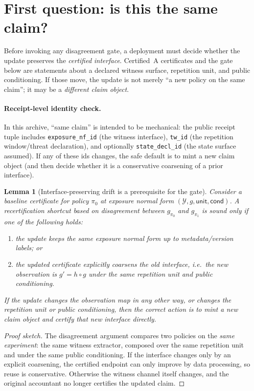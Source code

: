 \documentclass[11pt]{article}
\newtheorem{lemma}{Lemma}
\begin{document}
\section{First question: is this the same claim?}
Before invoking any disagreement gate, a deployment must decide whether the update preserves the \emph{certified interface}.
Certified~A certificates and the gate below are statements about a declared witness surface, repetition unit, and public conditioning.
If those move, the update is not merely ``a new policy on the same claim''; it may be a \emph{different claim object}.\cite{series:traceifaces,series:contractobjects}

\paragraph{Receipt-level identity check.}
In this archive, ``same claim'' is intended to be mechanical: the public receipt tuple includes \texttt{exposure\_nf\_id} (the witness interface), \texttt{tw\_id} (the repetition window/threat declaration), and optionally \texttt{state\_decl\_id} (the state surface assumed).
If any of these ids changes, the safe default is to mint a new claim object (and then decide whether it is a conservative coarsening of a prior interface).\cite{series:receiptitems,series:planstateequiv}

\begin{lemma}[Interface-preserving drift is a prerequisite for the gate]
\label{lem:sameclaimfirst}
Consider a baseline certificate for policy $\pi_0$ at exposure normal form $(\mathcal Y,g,\mathsf{unit},\mathsf{cond})$.
A recertification shortcut based on disagreement between $g_{\pi_0}$ and $g_{\pi_1}$ is sound only if one of the following holds:
\begin{enumerate}[leftmargin=*]
\item the update keeps the same exposure normal form up to metadata/version labels; or
\item the updated certificate explicitly coarsens the old interface, i.e.\ the new observation is $g' = h\circ g$ under the same repetition unit and public conditioning.
\end{enumerate}
If the update changes the observation map in any other way, or changes the repetition unit or public conditioning, then the correct action is to mint a new claim object and certify that new interface directly.
\end{lemma}

\begin{proof}[Proof sketch]
The disagreement argument compares two policies on the \emph{same experiment}: the same witness extractor, composed over the same repetition unit and under the same public conditioning.
If the interface changes only by an explicit coarsening, the certified endpoint can only improve by data processing, so reuse is conservative.
Otherwise the witness channel itself changes, and the original accountant no longer certifies the updated claim.
\end{proof}
\end{document}
